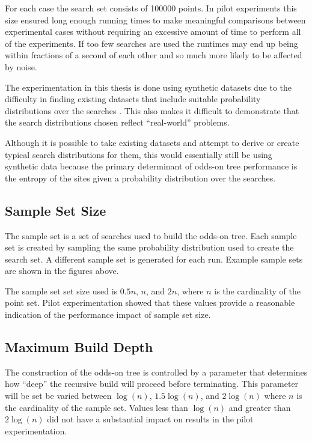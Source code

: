 \documentclass[mcs]{scsthesis}
\begin{document}
For each case the search set consists of 100000 points. In pilot experiments
this size ensured long enough running times to make meaningful comparisons
between experimental cases without requiring an excessive amount of time to
perform all of the experiments. If too few searches are used the runtimes may
end up being within fractions of a second of each other and so much more likely
to be affected by noise.

The experimentation in this thesis is done using synthetic datasets due to the
difficulty in finding existing datasets that include suitable probability
distributions over the searches . This also makes it difficult to demonstrate
that the search distributions chosen reflect ``real-world'' problems.

Although it is possible to take existing datasets and attempt to derive or
create typical search distributions for them, this would essentially still be
using synthetic data because the primary determinant of odds-on tree performance
is the entropy of the sites given a probability distribution over the searches.

\subsection{Sample Set Size}

The sample set is a set of searches used to build the odds-on tree. Each sample
set is created by sampling the same probability distribution used to create the
search set. A different sample set is generated for each run. Example sample
sets are shown in the figures above.

The sample set set size used is $0.5n$, $n$, and $2n$, where $n$ is the
cardinality of the point set. Pilot experimentation showed that these values
provide a reasonable indication of the performance impact of sample set size. 

\subsection{Maximum Build Depth}

The construction of the odds-on tree is controlled by a parameter that 
determines how ``deep'' the recursive build will proceed before terminating.
This parameter will be set be varied between $\log(n)$, $1.5\log(n)$, and
$2\log(n)$ where $n$ is the cardinality of the sample set. Values less than
$\log(n)$ and greater than $2\log(n)$ did not have a substantial impact on
results in the pilot experimentation. 
\end{document}
